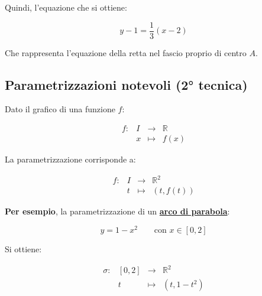 \documentclass[a4paper]{article}
\begin{document}
	\noindent
	Quindi, l'equazione che si ottiene:
	
	\begin{equation*}
		y - 1 = \dfrac{1}{3}\left(x - 2\right)
	\end{equation*}

	\noindent
	Che rappresenta l'equazione della retta nel fascio proprio di centro $A$.
	
	\newpage
	
	\subsection{Parametrizzazioni notevoli (2° tecnica)}
	
	Dato il grafico di una funzione $f$:
	
	\begin{equation*}
		\begin{array}{llll}
			f: & I & \longrightarrow & \mathbb{R} \\
			   & x & \longmapsto     & f\left(x\right)
		\end{array}
	\end{equation*}

	\noindent
	La parametrizzazione corrisponde a:
	
	\begin{equation*}
		\begin{array}{llll}
			f: & I & \longrightarrow & \mathbb{R}^{2} \\
			& t & \longmapsto     & \left(t, f\left(t\right)\right)
		\end{array}
	\end{equation*}

	\noindent
	\textcolor{Green4}{\textbf{Per esempio}}, la parametrizzazione di un \textcolor{Red3}{\textbf{\underline{arco di parabola}}}:
	
	\begin{equation*}
		y = 1 - x^{2} \hspace{2em} \text{con } x \in \left[0,2\right]
	\end{equation*}

	\noindent
	Si ottiene:
	
	\begin{equation*}
		\begin{array}{llll}
			\sigma: & \left[0,2\right] & \longrightarrow & \mathbb{R}^{2} \\
			& t & \longmapsto     & \left(t, 1-t^{2}\right)
		\end{array}
	\end{equation*}
\end{document}
